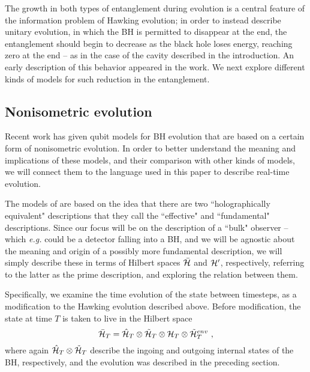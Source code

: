 \documentclass[11pt]{article}
\numberwithin{equation}{section}
\newcommand{\calh}{{\cal H}}
\newcommand{\beq}{\begin{equation}}
\newcommand{\eeq}{\end{equation}}
\begin{document}
The growth in both types of entanglement during evolution is a central feature of the information problem of Hawking evolution; in order to instead describe unitary evolution, in which the BH is permitted to disappear at the end, the entanglement should begin to decrease as the black hole loses energy, reaching zero at the end -- as in the case of the cavity described in the introduction.  An early description of this behavior appeared in the work\cite{Pageone,Pagetwo}.  We next explore different kinds of models for such reduction in the entanglement.


\subsection{Nonisometric evolution}

Recent work\cite{AEHPV} has given qubit models for BH evolution that are based on a certain form of nonisometric evolution.  In order to better understand the meaning and implications of these models, and their comparison with other kinds of models, we will connect them to the language used in this paper to describe real-time evolution.

The models of \cite{AEHPV} are based on the idea that there are two ``holographically equivalent" descriptions that they call the ``effective" and ``fundamental" descriptions.  Since our focus will be on the description of a ``bulk" observer -- which {\it e.g.} could be a detector falling into a BH, and we will be agnostic about the meaning and origin of a possibly more fundamental description, we will simply describe these in terms of Hilbert spaces $\bar \calh$ and $\calh'$, respectively, referring to the latter as the prime description, and exploring the relation between them.

Specifically, we examine the time evolution of the state between timesteps, as a modification to the Hawking evolution described above.  Before modification, the state at time $T$ is taken to live in the Hilbert space 
\beq
\bar \calh_T = \hat\calh_T \otimes \tilde \calh_T  \otimes \calh_T\otimes \tilde \calh^{env}_T\ ,
\eeq
where again $\hat\calh_T \otimes \tilde \calh_T$ describe the ingoing and outgoing internal states of the BH, respectively, and the evolution was described in the preceding section.
\end{document}
